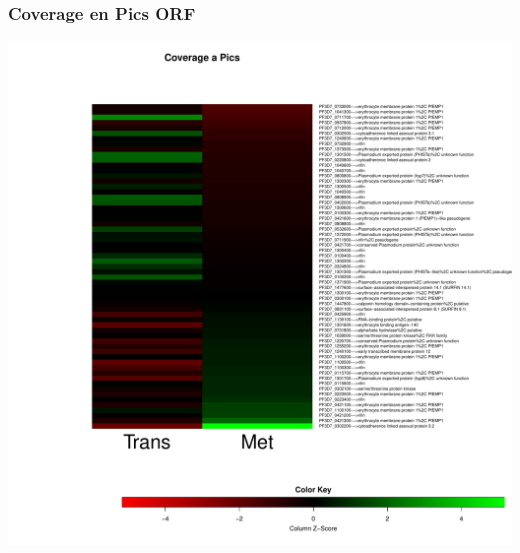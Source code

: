 \documentclass{article}\usepackage[]{graphicx}\usepackage[]{color}
\newenvironment{knitrout}{}{} %
\begin{document}
\subsubsection{Coverage en Pics ORF}
\begin{knitrout}
\color{fgcolor}

{\centering \includegraphics[width=.9\linewidth]{figure/minimal-met_covapics_ORF-1} 

}



\end{knitrout}
\clearpage
\end{document}
